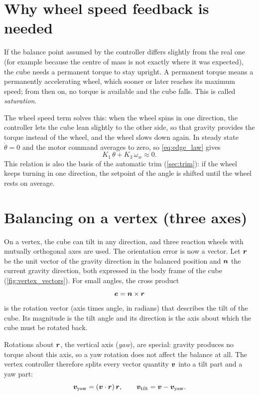 \section{Why wheel speed feedback is needed}
\label{sec:wheel_speed}

If the balance point assumed by the controller differs slightly from the real one (for example
because the centre of mass is not exactly where it was expected), the cube needs a permanent
torque to stay upright. A permanent torque means a permanently accelerating wheel, which sooner or
later reaches its maximum speed; from then on, no torque is available and the cube falls. This is
called \emph{saturation}.

The wheel speed term solves this: when the wheel spins in one direction, the controller lets the
cube lean slightly to the other side, so that gravity provides the torque instead of the wheel,
and the wheel slows down again. In steady state $\dot\theta = 0$ and the motor command averages to
zero, so \cref{eq:edge_law} gives
\begin{equation}
  K_1\,\theta + K_3\,\omega_w \approx 0 .
  \label{eq:equilibrium}
\end{equation}
This relation is also the basis of the automatic trim (\cref{sec:trim}): if the wheel keeps turning
in one direction, the setpoint of the angle is shifted until the wheel rests on average.

\section{Balancing on a vertex (three axes)}
\label{sec:vertex_model}

On a vertex, the cube can tilt in any direction, and three reaction wheels with mutually
orthogonal axes are used. The orientation error is now a vector. Let $\bm{r}$ be the unit vector
of the gravity direction in the balanced position and $\bm{n}$ the current gravity direction,
both expressed in the body frame of the cube (\cref{fig:vertex_vectors}). For small angles, the
cross product
\begin{equation}
  \bm{e} = \bm{n} \times \bm{r}
  \label{eq:vertex_error}
\end{equation}
is the rotation vector (axis times angle, in radians) that describes the tilt of the cube. Its
magnitude is the tilt angle and its direction is the axis about which the cube must be rotated
back.

Rotations about $\bm{r}$, the vertical axis (\emph{yaw}), are special: gravity produces no torque
about this axis, so a yaw rotation does not affect the balance at all. The vertex controller
therefore splits every vector quantity $\bm{v}$ into a tilt part and a yaw part:
\begin{equation}
  \bm{v}_\text{yaw} = (\bm{v}\cdot\bm{r})\,\bm{r}, \qquad
  \bm{v}_\text{tilt} = \bm{v} - \bm{v}_\text{yaw}.
  \label{eq:split}
\end{equation}

